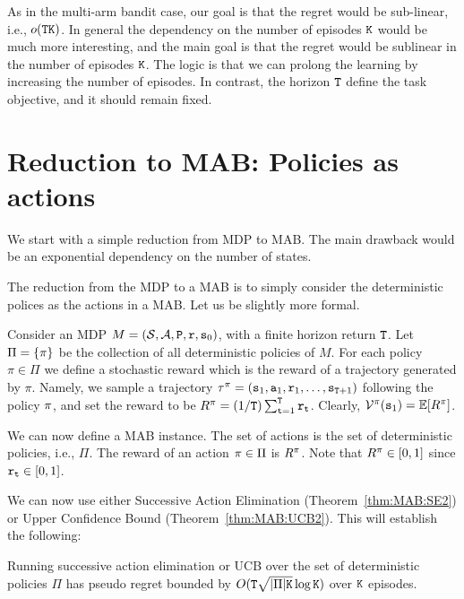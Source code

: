 As in the multi-arm bandit case, our goal is that the regret would be sub-linear, i.e., $o({\tt T}{\tt K})$. In general the dependency on the number of episodes ${\tt K}$ would be much more interesting, and the main goal is that the regret would be sublinear in the number of episodes ${\tt K}$. The logic is that we can prolong the learning by increasing the number of episodes. In contrast, the horizon ${\tt T}$ define the task objective, and it should remain fixed.



\section{Reduction to MAB: Policies as actions}

We start with a simple reduction from MDP to MAB. The main drawback would be an exponential dependency on the number of states.

The reduction from the MDP to a MAB is to simply consider the deterministic polices as the actions in a MAB.
Let us be slightly more formal. 

Consider an MDP $M=(\mathcal{S},\mathcal{A},{\tt P},{\tt r},{\tt s}_0)$, with a finite horizon return ${\tt T}$.
Let $\Pi=\{\pi\}$ be the collection of all deterministic policies of $M$. For each policy  $\pi\in \Pi$ we define a stochastic reward which is the reward of a trajectory generated by $\pi$. Namely, we sample a trajectory $\tau^\pi=({\tt s}_1, {\tt a}_1,{\tt r}_1, \ldots, {\tt s}_{{\tt T}+1})$ following the policy $\pi$, and set the reward to be  $R^\pi=(1/{\tt T})\sum_{{\tt t}=1}^{\tt T} {\tt r}_{\tt t}$. Clearly, $\mathcal{V}^\pi({\tt s}_1)=\mathbb{E}[R^\pi]$.

We can now define a MAB instance. The set of actions is the set of deterministic policies, i.e., $\Pi$. The reward of an action $\pi\in\Pi$ is $R^\pi$. Note that $R^\pi\in[0,1]$ since ${\tt r}_{\tt t}\in[0,1]$.

We can now use either Successive Action Elimination (Theorem~\ref{thm:MAB:SE2}) or Upper Confidence Bound (Theorem~\ref{thm:MAB:UCB2}). This will establish the following:

\begin{theorem}
Running successive action elimination or UCB over the set of deterministic policies $\Pi$ has pseudo regret bounded by $O( {\tt T} \sqrt{|\Pi|{\tt K}}\log{\tt K})$ over ${\tt K}$ episodes.
\end{theorem}

